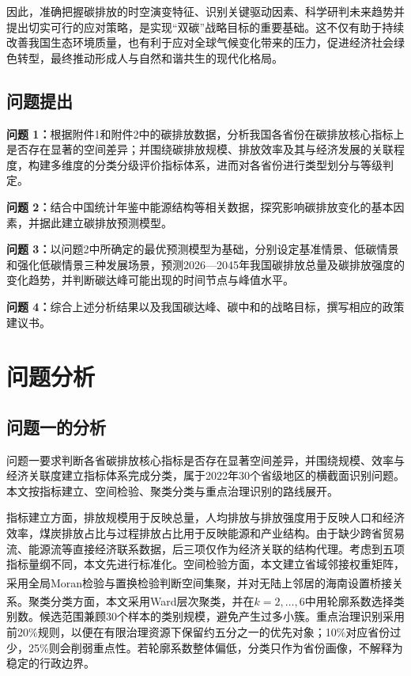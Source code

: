 \documentclass[12pt,a4paper]{ctexart}
\theoremstyle{definition}
\theoremstyle{plain}
\theoremstyle{remark}
\newcommand{\upcite}[1]{\textsuperscript{\cite{#1}}}
\begin{document}
因此，准确把握碳排放的时空演变特征、识别关键驱动因素、科学研判未来趋势并提出切实可行的应对策略，是实现“双碳”战略目标的重要基础。这不仅有助于持续改善我国生态环境质量，也有利于应对全球气候变化带来的压力，促进经济社会绿色转型，最终推动形成人与自然和谐共生的现代化格局。

\subsection{问题提出}

\textbf{问题 1：}根据附件1和附件2中的碳排放数据，分析我国各省份在碳排放核心指标上是否存在显著的空间差异；并围绕碳排放规模、排放效率及其与经济发展的关联程度，构建多维度的分类分级评价指标体系，进而对各省份进行类型划分与等级判定。

\textbf{问题 2：}结合中国统计年鉴中能源结构等相关数据，探究影响碳排放变化的基本因素，并据此建立碳排放预测模型。

\textbf{问题 3：}以问题2中所确定的最优预测模型为基础，分别设定基准情景、低碳情景和强化低碳情景三种发展场景，预测2026—2045年我国碳排放总量及碳排放强度的变化趋势，并判断碳达峰可能出现的时间节点与峰值水平。

\textbf{问题 4：}综合上述分析结果以及我国碳达峰、碳中和的战略目标，撰写相应的政策建议书。

\section{问题分析}

\subsection{问题一的分析}
问题一要求判断各省碳排放核心指标是否存在显著空间差异，并围绕规模、效率与经济关联度建立指标体系完成分类，属于2022年30个省级地区的横截面识别问题。本文按指标建立、空间检验、聚类分类与重点治理识别的路线展开。

指标建立方面，排放规模用于反映总量，人均排放与排放强度用于反映人口和经济效率，煤炭排放占比与过程排放占比用于反映能源和产业结构。由于缺少跨省贸易流、能源流等直接经济联系数据，后三项仅作为经济关联的结构代理。考虑到五项指标量纲不同，本文先进行标准化。空间检验方面，本文建立省域邻接权重矩阵，采用全局Moran检验\upcite{moran}与置换检验判断空间集聚，并对无陆上邻居的海南设置桥接关系。聚类分类方面，本文采用Ward层次聚类\upcite{ward}，并在$k=2,\ldots,6$中用轮廓系数选择类别数。候选范围兼顾30个样本的类别规模，避免产生过多小簇。重点治理识别采用前20\%规则，以便在有限治理资源下保留约五分之一的优先对象；10\%对应省份过少，25\%则会削弱重点性。若轮廓系数整体偏低，分类只作为省份画像，不解释为稳定的行政边界。
\end{document}
